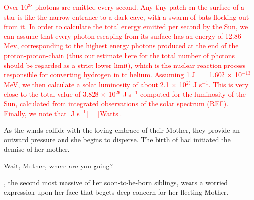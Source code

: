 \documentclass[main.tex]{subfiles}
\begin{document}
\begin{tcolorbox}[sharp corners, colback=red!30, colframe=red!80!blue, title=Stellar luminosity]
\par \textcolor{red} {Over 10$^{38}$ photons are emitted every second.  Any tiny patch on the surface of a star is like the narrow entrance to a dark cave, with a swarm of bats flocking out from it.  In order to calculate the total energy emitted per second by the Sun, we can assume that every photon escaping from its surface has an energy of 12.86 Mev, corresponding to the highest energy photons produced at the end of the proton-proton-chain (thus our estimate here for the total number of photons should be regarded as a strict lower limit), which is the nuclear reaction process responsible for converting hydrogen in to helium.  Assuming 1 J $=$ 1.602 $\times$ 10$^{-13}$ MeV, we then calculate a solar luminosity of about 2.1 ${\times}$ 10$^{26}$ J s$^{-1}$.  This is very close to the total value of 3.828 $\times$ 10$^{26}$ J s$^{-1}$ computed for the luminosity of the Sun, calculated from integrated observations of the solar spectrum (REF). Finally, we note that [J s$^{-1}$] = [Watts].}  
\end{tcolorbox}

\par \nar As the winds collide with the loving embrace of their Mother, they provide an outward pressure and she begins to disperse.  The birth of \rmmaia had initiated the demise of her mother.  

\par \Maia Wait, Mother, where are you going?  

\par \nar \rmmaia, the second most massive of her soon-to-be-born siblings, wears a worried expression upon her face that begets deep concern for her fleeting Mother.  




\end{document}
